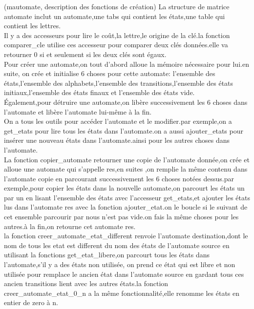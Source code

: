 \documentclass{report}
\begin{document}
(mautomate, description des fonctions de création)
La structure de matrice automate inclut un automate,une tabs qui contient les états,une table qui contient les lettres.\\

Il y a des accesseurs pour lire le coût,la lettre,le origine de la clé.la fonction comparer\_cle utilise ces accesseur pour comparer deux clés données.elle va retourner 0 si et seulement si les deux clés sont égaux.\\

Pour créer une automate,on tout d'abord alloue la mémoire nécessaire pour lui.en suite, on crée et initialise 6 choses pour cette automate: l'ensemble des états,l'ensemble des alphabets,l'ensemble des transitions,l'ensemble des états initiaux,l'ensemble des états finaux et l'ensemble des états vide.\\

Également,pour détruire une automate,on libère successivement les 6 choses dans l'automate et libère l'automate lui-même à la fin.\\

On a tous les outils pour accéder l'automate et le modifier.par exemple,on a get\_etats pour lire tous les états dans l'automate.on a aussi ajouter\_etats pour insérer une nouveau états dans l'automate.ainsi pour les autres choses dans l'automate.\\

La fonction copier\_automate retourner une copie de l'automate donnée,on crée et alloue une automate qui s'appelle res,en suites ,on remplie la même contenu  dans l'automate copie en parcourant successivement les 6 choses notées dessus.par exemple,pour copier les états dans la nouvelle automate,on parcourt les états un par un en lisant l'ensemble des états avec l'accesseur get\_etats,et ajouter les états lus dans l'automate res avec la fonction ajouter\_etat.on le boucle si le suivant de cet ensemble parcourir par nous n'est pas vide.on fais la même choses pour les autres.à la fin,on retourne cet automate res.\\

la fonction creer\_automate\_etat\_different renvoie l'automate destination,dont le nom de tous les etat est different du nom des états de l'automate source en utilisant la fonctions get\_etat\_libere,on parcourt tous les états dans l'automate,s'il y a des états non utilisée, on prend ce état qui est libre et non utilisée pour remplace le ancien état dans l'automate source en gardant tous ces ancien transitions lient avec les autres états.la fonction creer\_automate\_etat\_0\_n a la même fonctionnalité,elle renomme les états en entier de zero à n.\\
\end{document}
